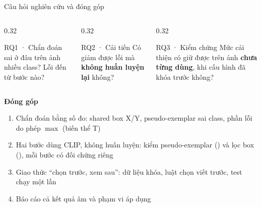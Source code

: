\documentclass[aspectratio=169,10pt]{beamer}
\begin{document}
\begin{frame}{Câu hỏi nghiên cứu và đóng góp}
\begin{columns}[T]
\begin{column}{0.32\textwidth}
\begin{block}{RQ1 · Chẩn đoán}
\small \cgdpp{} sai ở đâu trên ảnh nhiều class? Lỗi đến từ bước nào?
\end{block}
\end{column}
\begin{column}{0.32\textwidth}
\begin{block}{RQ2 · Cải tiến}
\small Có giảm được lỗi mà \textbf{không huấn luyện lại} không?
\end{block}
\end{column}
\begin{column}{0.32\textwidth}
\begin{block}{RQ3 · Kiểm chứng}
\small Mức cải thiện có giữ được trên ảnh \textbf{chưa từng dùng}, khi cấu hình đã khóa trước không?
\end{block}
\end{column}
\end{columns}
\vspace{3mm}
\textbf{Đóng góp}
\begin{enumerate}\small
\item Chẩn đoán bằng số đo: shared box X/Y, pseudo-exemplar sai class, phần lỗi do phép $\max$ (biến thể T)
\item Hai bước dùng CLIP, không huấn luyện: kiểm pseudo-exemplar (\Pv) và lọc box (\Fv), mỗi bước có đối chứng riêng
\item Giao thức ``chọn trước, xem sau'': dữ liệu khóa, luật chọn viết trước, test chạy một lần
\item Báo cáo cả kết quả âm và phạm vi áp dụng
\end{enumerate}
\end{frame}
\end{document}

